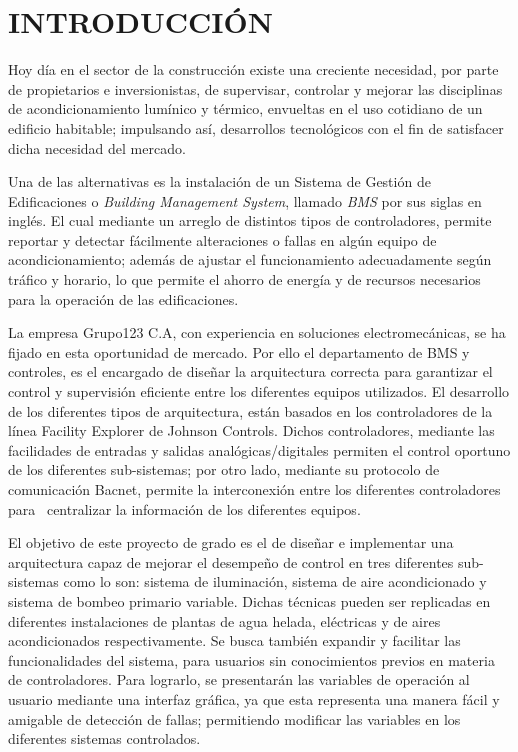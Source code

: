 \chapter*{INTRODUCCIÓN}
\thispagestyle{empty}
Hoy día en el sector de la construcción existe una creciente necesidad, por parte de propietarios e inversionistas, de supervisar, controlar y mejorar las disciplinas de acondicionamiento lumínico y térmico, envueltas en el uso cotidiano de un edificio habitable; impulsando así, desarrollos tecnológicos con el fin de satisfacer dicha necesidad del mercado. 

Una de las alternativas es la instalación de un Sistema de Gestión de Edificaciones o \textit{Building Management System}, llamado \textit{BMS} por sus siglas en inglés. El cual mediante un arreglo de distintos tipos de controladores, permite reportar y detectar fácilmente alteraciones o fallas en algún equipo de acondicionamiento; además de ajustar el funcionamiento adecuadamente según tráfico y horario, lo que permite el ahorro de energía y de recursos necesarios para la operación de las edificaciones.

La empresa Grupo123 C.A, con experiencia en soluciones electromecánicas, se ha fijado en esta oportunidad de mercado. Por ello el departamento de BMS y controles, es el encargado de diseñar la arquitectura correcta para garantizar el control y supervisión eficiente entre los diferentes equipos utilizados. El desarrollo de los diferentes tipos de arquitectura, están basados en los controladores de la línea Facility Explorer de Johnson Controls. Dichos controladores, mediante las facilidades de entradas y salidas analógicas/digitales permiten el control oportuno de los diferentes sub-sistemas; por otro lado, mediante su protocolo de comunicación Bacnet, permite la interconexión entre los diferentes controladores para  centralizar la información de los diferentes equipos.

El objetivo de este proyecto de grado es el de diseñar e implementar una arquitectura capaz de mejorar el desempeño de control en tres diferentes sub-sistemas como lo son: sistema de iluminación, sistema de aire acondicionado y sistema de bombeo primario variable. Dichas técnicas pueden ser replicadas en diferentes instalaciones de plantas de agua helada, eléctricas y de aires acondicionados respectivamente. Se busca también expandir y facilitar las funcionalidades del sistema, para usuarios sin conocimientos previos en materia de controladores. Para lograrlo, se presentarán las variables de operación al usuario mediante una interfaz gráfica, ya que esta representa una manera fácil y amigable de detección de fallas; permitiendo modificar las variables en los diferentes sistemas controlados.\newline

